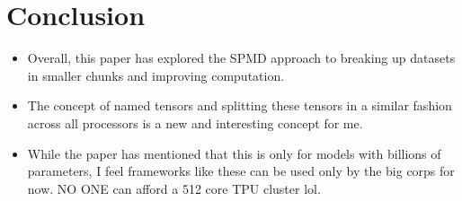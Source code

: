 \documentclass[a4paper]{article}
\begin{document}
\section{Conclusion}
\begin{itemize}
    \item Overall, this paper has explored the SPMD approach to breaking up datasets in smaller chunks and improving computation.
    \item The concept of named tensors and splitting these tensors in a similar fashion across all processors is a new and interesting concept for me. 
    \item While the paper has mentioned that this is only for models with billions of parameters, I feel frameworks like these can be used only by the big corps for now. NO ONE can afford a 512 core TPU cluster lol.
\end{itemize}
\end{document}

